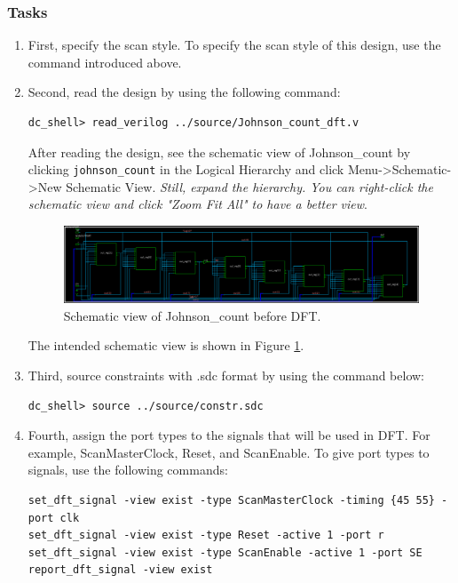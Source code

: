 \documentclass[a4paper,12pt,twoside]{article}
\begin{document}
\subsubsection{Tasks}\label{SDFTCTask}
\begin{enumerate}
    \item First, specify the scan style. To specify the scan style of this design, use the command introduced above.
    \item Second, read the design by using the following command:
    \begin{verbatim}
dc_shell> read_verilog ../source/Johnson_count_dft.v
    \end{verbatim}
    After reading the design, see the schematic view of Johnson\_count by clicking \texttt{johnson\_count} in the Logical Hierarchy and click Menu->Schematic->New Schematic View. \textit{Still, expand the hierarchy. You can right-click the schematic view and click "Zoom Fit All" to have a better view}.
    \begin{figure}[H]
        \centering
        \includegraphics[width=\textwidth]{images/25.png}
        \caption{Schematic view of Johnson\_count before DFT.}
        \label{f25}
    \end{figure}
    The intended schematic view is shown in Figure \ref{f25}.
    \item Third, source constraints with .sdc format by using the command below:
    \begin{verbatim}
dc_shell> source ../source/constr.sdc
    \end{verbatim}
    \item Fourth, assign the port types to the signals that will be used in DFT. For example, ScanMasterClock, Reset, and ScanEnable. To give port types to signals, use the following commands:
    \begin{verbatim}
set_dft_signal -view exist -type ScanMasterClock -timing {45 55} -port clk
set_dft_signal -view exist -type Reset -active 1 -port r
set_dft_signal -view exist -type ScanEnable -active 1 -port SE
report_dft_signal -view exist
    \end{verbatim}

\end{enumerate}
\end{document}
